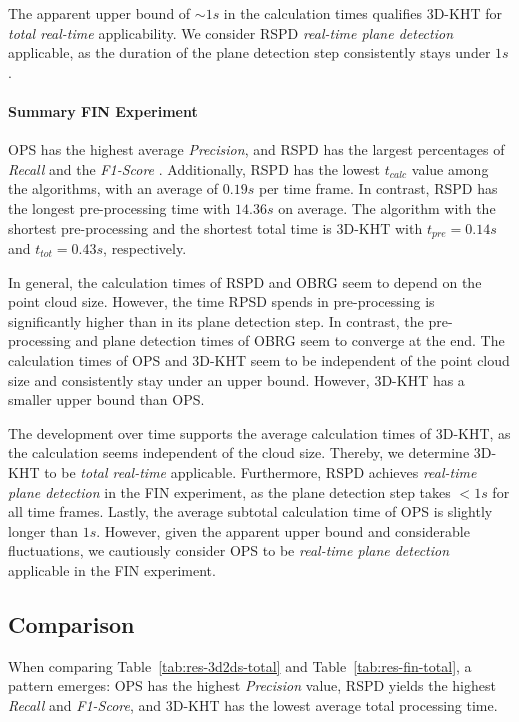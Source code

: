 \documentclass[main.tex]{subfiles}
\begin{document}
The apparent upper bound of ${\sim}1s$ in the calculation times qualifies 3D-KHT for
\textit{total real-time} applicability.
We consider RSPD \textit{real-time plane detection} applicable, as the duration of the
plane detection step consistently stays under $1s$.

\paragraph{Summary FIN Experiment}
\label{par:sumfinexp}
OPS has the highest average \textit{Precision}, and RSPD has the largest percentages of \textit{Recall} and the \textit{F1-Score} .
Additionally, RSPD has the lowest $t_{calc}$ value among the algorithms,
with an average of $0.19s$ per time frame. In contrast, RSPD has the longest pre-processing time with $14.36s$ on average.
The algorithm with the shortest pre-processing and the shortest total time is 3D-KHT with $t_{pre}=0.14s$ and $t_{tot}=0.43s$,
respectively.


In general, the calculation times of RSPD and OBRG seem to depend on the point cloud size.
However, the time RPSD spends in pre-processing is significantly higher than in its plane detection step.
In contrast, the pre-processing and plane detection times of OBRG seem to converge at the end.
The calculation times of OPS and 3D-KHT seem to be independent of the point cloud size and consistently stay under an upper bound.
However, 3D-KHT has a smaller upper bound than OPS.

The development over time supports the average calculation times of 3D-KHT, as the calculation
seems independent of the cloud size. Thereby, we determine 3D-KHT to be \textit{total real-time}
applicable.
Furthermore, RSPD achieves \textit{real-time plane detection} in the FIN experiment, as the
plane detection step takes $<1s$ for all time frames.
Lastly, the average subtotal calculation time of OPS is slightly longer than $1s$. However, given
the apparent upper bound and considerable fluctuations, we cautiously consider OPS to be
\textit{real-time plane detection} applicable in the FIN experiment.

\subsection{Comparison}
When comparing Table~\ref{tab:res-3d2ds-total} and Table~\ref{tab:res-fin-total}, a pattern emerges:
OPS has the highest \textit{Precision} value, RSPD yields the highest \textit{Recall} and \textit{F1-Score}, and 3D-KHT has the lowest
average total processing time.
\end{document}
